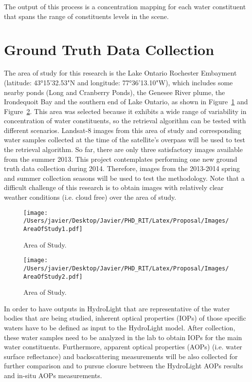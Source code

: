The output of this process is a concentration mapping for each water constituent that spans the range of constituents levels in the scene. 

\section{Ground Truth Data Collection}
The area of study for this research is the Lake Ontario Rochester Embayment (latitude: 43°15'32.53"N and longitude: 77°36'13.10"W), which includes some nearby ponds (Long and Cranberry Ponds), the Genesee River plume, the Irondequoit Bay and the southern end of Lake Ontario, as shown in Figure~\ref{fig:areaofstudy1} and Figure~\ref{fig:areaofstudy2}. This area was selected because it exhibits a wide range of variability in concentration of water constituents, so the retrieval algorithm can be tested with different scenarios. Landsat-8 images from this area of study and corresponding water samples collected at the time of the satellite's overpass will be used to test the retrieval algorithm. So far, there are only three satisfactory images available from the summer 2013. This project contemplates performing one new ground truth data collection during 2014. Therefore, images from the 2013-2014 spring and summer collection seasons will be used to test the methodology. Note that a difficult challenge of this research is to obtain images with relatively clear weather conditions (i.e. cloud free) over the area of study.
\begin{figure}[htb]
  \centering
  \texttt{[image: /Users/javier/Desktop/Javier/PHD\_RIT/Latex/Proposal/Images/AreaOfStudy1.pdf]}
  \caption{Area of Study. \label{fig:areaofstudy1} } 
\end{figure}
\begin{figure}[htb]
  \centering
  \texttt{[image: /Users/javier/Desktop/Javier/PHD\_RIT/Latex/Proposal/Images/AreaOfStudy2.pdf]}
  \caption{Area of Study. \label{fig:areaofstudy2} } 
\end{figure}

In order to have outputs in HydroLight that are representative of the water bodies that are being studied, inherent optical properties (IOPs) of those specific waters have to be defined as input to the HydroLight model. After collection, these water samples need to be analyzed in the lab to obtain IOPs for the main water constituents. Furthermore, apparent optical properties (AOPs) (i.e. water surface reflectance) and backscattering measurements will be also collected for further comparison and to pursue closure between the HydroLight AOPs results and in-situ AOPs measurements.

